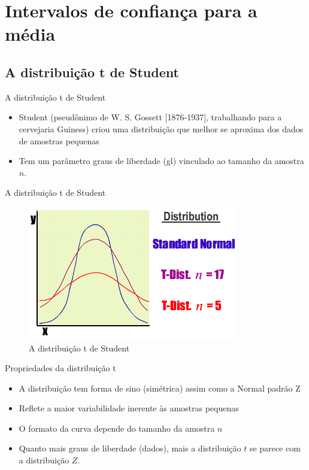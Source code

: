 \documentclass{beamer}
\begin{document}
\section{Intervalos de confiança para a média}

\subsection{A distribuição t de Student}

\begin{frame}{A distribuição t de Student}
  \begin{itemize}
  \item Student (pseudônimo de W. S. Gossett [1876-1937], trabalhando
    para a cervejaria Guiness) criou uma distribuição que melhor se
    aproxima dos dados de amostras pequenas
  \item Tem um parâmetro \alert{graus de liberdade} (gl) vinculado ao
    tamanho da amostra $n$.
  \end{itemize}
\end{frame}

\begin{frame}{A distribuição t de Student}
  \begin{figure}
    \includegraphics[height=0.7\textheight]{t_graph}
    \caption{A distribuição t de Student}
  \end{figure}
\end{frame}

\begin{frame}{Propriedades da distribuição t}
  \begin{itemize}
  \item A distribuição tem forma de sino (simétrica) assim como a
    Normal padrão Z
  \item Reflete a maior variabilidade inerente às amostras pequenas
  \item O formato da curva depende do tamanho da amostra $n$
  \item Quanto mais graus de liberdade (dados), mais a distribuição
    $t$ se parece com a distribuição $Z$.
  \end{itemize}
\end{frame}
\end{document}
